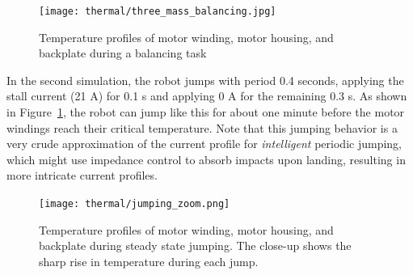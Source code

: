\documentclass{report}
\begin{document}
\begin{figure}[H]
	\centering
	\texttt{[image: thermal/three\_mass\_balancing.jpg]}
	\caption{Temperature profiles of motor winding, motor housing, and backplate during a balancing task}
	\label{fig:thermal_balancing}
\end{figure}

In the second simulation, the robot jumps with period 0.4 seconds, applying the stall current (21 A) for 0.1 s and applying 0 A for the remaining 0.3 s. As shown in Figure~\ref{fig:thermal_balancing}, the robot can jump like this for about one minute before the motor windings reach their critical temperature. Note that this jumping behavior is a very crude approximation of the current profile for \textit{intelligent} periodic jumping, which might use impedance control to absorb impacts upon landing, resulting in more intricate current profiles.
\begin{figure}[H]
	\centering
	\texttt{[image: thermal/jumping\_zoom.png]}
	\caption{Temperature profiles of motor winding, motor housing, and backplate during steady state jumping. The close-up shows the sharp rise in temperature during each jump.}
	\label{fig:thermal_jumping}
\end{figure}
\end{document}
